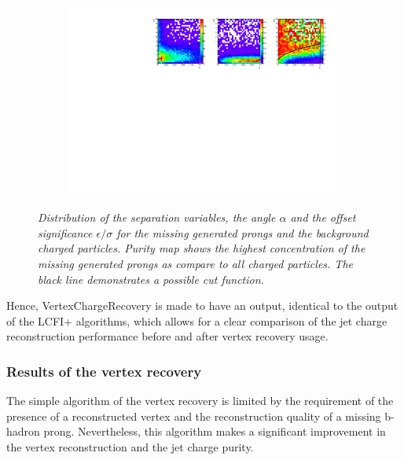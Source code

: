\begin{figure}[H]
\begin{subfigure}{0.33\textwidth}
		\includegraphics[clip, trim=13.6cm 0cm 0.4cm 0.cm,width=0.99\textwidth]{ILD/plots/recovery-purity.pdf}
		\caption{\label{fig:RecoveryPurity_c_3} }
	\end{subfigure}
	\caption{\sl Distribution of the separation variables, the angle $\alpha$ and the offset significance $\epsilon/\sigma$ for the missing generated prongs and the background charged particles. Purity map shows the highest concentration of the missing generated prongs as compare to all charged particles. The black line demonstrates a possible cut function. }
	
	\label{fig:RecoveryPurity_3}
\end{figure}

Hence, VertexChargeRecovery is made to have an output, identical to the output of the LCFI+ algorithms, which allows for a clear comparison of the jet charge reconstruction performance before and after vertex recovery usage.
\subsubsection{Results of the vertex recovery}

The simple algorithm of the vertex recovery is limited by the requirement of the presence of a reconstructed vertex and the reconstruction quality of a missing b-hadron prong. 
Nevertheless, this algorithm makes a significant improvement in the vertex reconstruction and the jet charge purity.

